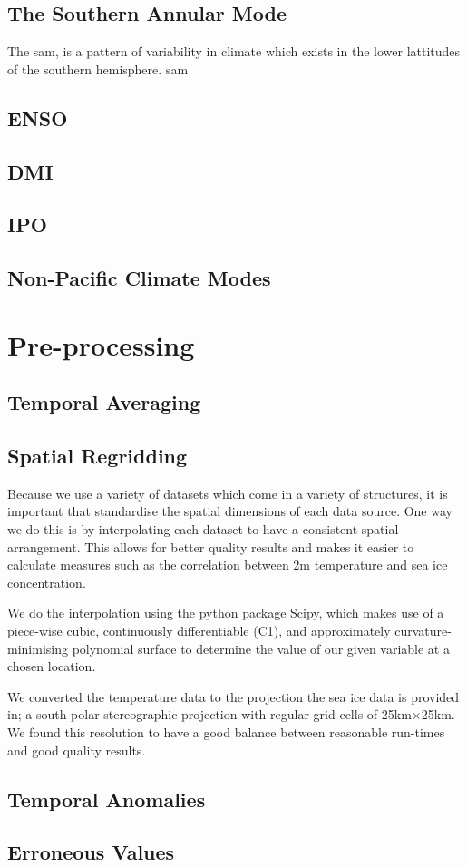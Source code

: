\documentclass[../main.tex]{subfiles}
\begin{document}
\subsection*{The Southern Annular Mode}
The \gls{sam}, is a pattern of variability in climate which exists in the lower lattitudes of the southern hemisphere. \gls{sam}
\subsection*{ENSO}
\subsection*{DMI}
\subsection*{IPO}
\subsection*{Non-Pacific Climate Modes}


\section{Pre-processing}
\subsection*{Temporal Averaging}
\subsection*{Spatial Regridding}
Because we use a variety of datasets which come in a variety of structures, it is important that standardise the spatial dimensions of each data source. One way we do this is by interpolating each dataset to have a consistent spatial arrangement. This allows for better quality results and makes it easier to calculate measures such as the correlation between 2m temperature and sea ice concentration.

We do the interpolation using the python package Scipy, which makes use of a piece-wise cubic, continuously differentiable (C1), and approximately curvature-minimising polynomial surface to determine the value of our given variable at a chosen location. 

We converted the temperature data to the projection the sea ice data is provided in; a south polar stereographic projection with regular grid cells of 25km$\times$25km. We found this resolution to have a good balance between reasonable run-times and good quality results.

\subsection*{Temporal Anomalies}
\subsection*{Erroneous Values}
\end{document}
